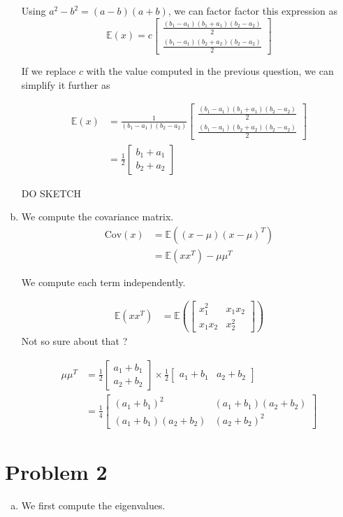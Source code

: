 \documentclass[a4paper, 12pt, twoside]{article}
\begin{document}
\begin{enumerate}[a)]
    Using $a^2-b^2 = (a-b)(a+b)$, we can factor factor this expression as 
    $$\mathbb{E}(x) = c\begin{bmatrix} \frac{(b_1-a_1)(b_1+a_1)(b_2-a_2)}{2} \\ \frac
    {(b_1-a_1)(b_2+a_2)(b_2-a_2)}{2} \end{bmatrix}$$

    If we replace $c$ with the value computed in the previous question, we can simplify it further as

    \begin{align*}
        \mathbb{E}(x) &= \frac{1}{(b_1-a_1)(b_2-a_2)}\begin{bmatrix} \frac{(b_1-a_1)(b_1+a_1)(b_2-a_2)}{2} \\ \frac{(b_1-a_1)(b_2+a_2)(b_2-a_2)}{2} \end{bmatrix} \\
    &= \frac{1}{2}\begin{bmatrix} b_1+a_1 \\ b_2+a_2 \end{bmatrix}
    \end{align*}

    DO SKETCH

    \item We compute the covariance matrix.
    \begin{align*}
        \mathrm{Cov}(x) &= \mathbb{E}((x-\mu)(x-\mu)^T) \\
        &= \mathbb{E}(xx^T) - \mu\mu^T
    \end{align*}

    We compute each term independently.

    \begin{align*}
    \mathbb{E}(xx^T) &= \mathbb{E}(\begin{bmatrix} x_1^2 & x_1x_2 \\ x_1x_2 & x_2^2 \end{bmatrix})
    \end{align*}
    Not so sure about that ?

    \begin{align*}
    \mu\mu^T &= \frac{1}{2}\begin{bmatrix} a_1+b_1 \\ a_2+b_2 \end{bmatrix} \times\frac{1}{2} \begin{bmatrix} a_1+b_1 & a_2+b_2 \end{bmatrix} \\
        &= \frac{1}{4}\begin{bmatrix} (a_1+b_1)^2 & (a_1+b_1)(a_2+b_2) \\ (a_1+b_1)(a_2+b_2) & (a_2+b_2)^2 \end{bmatrix}
    \end{align*}

\end{enumerate}

\section{Problem 2}

\begin{enumerate}[a)]
    \item We first compute the eigenvalues.
    
\end{enumerate}
\end{document}
